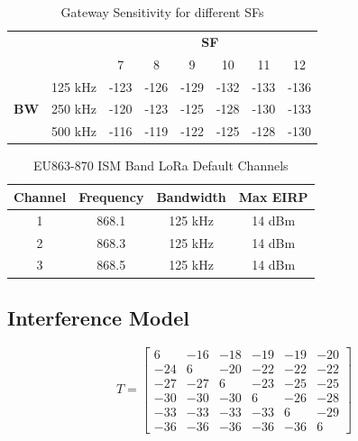 \documentclass[conference]{IEEEtran}
\begin{document}
\begin{table}
\centering
\caption{Gateway Sensitivity for different SFs}
\label{table:gw_sf_sensitivity}
\begin{tabular}{|c|c|c|c|c|c|c|c|}
\hline
\multicolumn{2}{|c|}{\multirow{2}{*}{}} & \multicolumn{6}{c|}{\textbf{SF}} \\ \cline{3-8}
\multicolumn{2}{|c|}{}                  &    7 &    8 &    9 &   10 &   11 &   12 \\ \hline
\multirow{3}{*}{\textbf{BW}}  & 125 kHz & -123 & -126 & -129 & -132 & -133 & -136 \\ \cline{2-8}
                              & 250 kHz & -120 & -123 & -125 & -128 & -130 & -133 \\ \cline{2-8}
                              & 500 kHz & -116 & -119 & -122 & -125 & -128 & -130 \\ \hline
\end{tabular}
\end{table}

\begin{table}
\centering
\caption{EU863-870 ISM Band LoRa Default Channels}
\label{table:max_tx_power}
\begin{tabular}{|c|c|c|c|}
\hline
\textbf{Channel} & \textbf{Frequency} & \textbf{Bandwidth} & \textbf{Max EIRP} \\ \hline
      1 &     868.1 &   125 kHz &   14 dBm \\ \hline
      2 &     868.3 &   125 kHz &   14 dBm \\ \hline
      3 &     868.5 &   125 kHz &   14 dBm \\

\hline
\end{tabular}
\end{table}

\subsection{Interference Model}
\par [TODO]

\begin{equation} \label{eq:sinr}
T = \begin{bmatrix}
       6 & -16 & -18 & -19 & -19 & -20 \\
     -24 &   6 & -20 & -22 & -22 & -22 \\
     -27 & -27 &   6 & -23 & -25 & -25 \\
     -30 & -30 & -30 &   6 & -26 & -28 \\
     -33 & -33 & -33 & -33 &   6 & -29 \\
     -36 & -36 & -36 & -36 & -36 &   6
     \end{bmatrix}
\end{equation}
\end{document}
